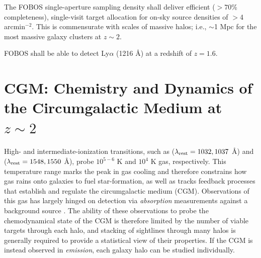 \documentclass[11pt,a4paper,twoside,onecolumn,openany,final,oldfontcommands]{memoir}
\begin{document}
\medskip
\begin{sciencerequirement}
\reqitem The FOBOS single-aperture sampling density shall deliver efficient ($>70$\% completeness), single-visit target allocation for on-sky source densities of $>$4 arcmin$^{-2}$.  This is commensurate with scales of massive halos; i.e., $\sim$1 Mpc for the most massive galaxy clusters at $z\sim 2$. \label{prog:igm:dens}


\reqitem FOBOS shall be able to detect Ly$\alpha$ (1216 \AA{}) at a redshift of $z=1.6$.  

\end{sciencerequirement}




\section{CGM: Chemistry and Dynamics of the Circumgalactic Medium at $z\sim2$}

High- and intermediate-ionization transitions, such as  ($\lambda_{\rm rest} = 1032, 1037$ \AA) and  ($\lambda_{\rm rest} = 1548, 1550$ \AA), probe $10^{5-6}$ K and $10^4$ K gas, respectively.  This temperature range marks the peak in gas cooling and therefore constrains how gas rains onto galaxies to fuel star-formation, as well as tracks feedback processes that establish and regulate the circumgalactic medium (CGM).  Observations of this gas has largely hinged on detection via \textit{absorption} measurements against a background source .  The ability of these observations to probe the chemodynamical state of the CGM is therefore limited by the number of viable targets through each halo, and stacking of sightlines through many halos is generally required to provide a statistical view of their properties.  If the CGM is instead observed in \textit{emission}, each galaxy halo can be studied individually.
\end{document}
